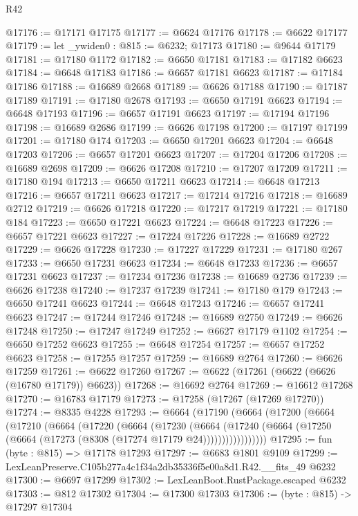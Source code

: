\begin{lexlean}{R42}
\begin{coremodule}
{@17176 := @17171 @17175
@17177 := @6624 @17176
@17178 := @6622 @17177
@17179 := let _ywiden0 : @815 := @6232; @17173
@17180 := @9644 @17179
@17181 := @17180 @1172
@17182 := @6650 @17181
@17183 := @17182 @6623
@17184 := @6648 @17183
@17186 := @6657 @17181 @6623
@17187 := @17184 @17186
@17188 := @16689 @2668
@17189 := @6626 @17188
@17190 := @17187 @17189
@17191 := @17180 @2678
@17193 := @6650 @17191 @6623
@17194 := @6648 @17193
@17196 := @6657 @17191 @6623
@17197 := @17194 @17196
@17198 := @16689 @2686
@17199 := @6626 @17198
@17200 := @17197 @17199
@17201 := @17180 @174
@17203 := @6650 @17201 @6623
@17204 := @6648 @17203
@17206 := @6657 @17201 @6623
@17207 := @17204 @17206
@17208 := @16689 @2698
@17209 := @6626 @17208
@17210 := @17207 @17209
@17211 := @17180 @194
@17213 := @6650 @17211 @6623
@17214 := @6648 @17213
@17216 := @6657 @17211 @6623
@17217 := @17214 @17216
@17218 := @16689 @2712
@17219 := @6626 @17218
@17220 := @17217 @17219
@17221 := @17180 @184
@17223 := @6650 @17221 @6623
@17224 := @6648 @17223
@17226 := @6657 @17221 @6623
@17227 := @17224 @17226
@17228 := @16689 @2722
@17229 := @6626 @17228
@17230 := @17227 @17229
@17231 := @17180 @267
@17233 := @6650 @17231 @6623
@17234 := @6648 @17233
@17236 := @6657 @17231 @6623
@17237 := @17234 @17236
@17238 := @16689 @2736
@17239 := @6626 @17238
@17240 := @17237 @17239
@17241 := @17180 @179
@17243 := @6650 @17241 @6623
@17244 := @6648 @17243
@17246 := @6657 @17241 @6623
@17247 := @17244 @17246
@17248 := @16689 @2750
@17249 := @6626 @17248
@17250 := @17247 @17249
@17252 := @6627 @17179 @1102
@17254 := @6650 @17252 @6623
@17255 := @6648 @17254
@17257 := @6657 @17252 @6623
@17258 := @17255 @17257
@17259 := @16689 @2764
@17260 := @6626 @17259
@17261 := @6622 @17260
@17267 := @6622 (@17261 (@6622 (@6626 (@16780 @17179)) @6623))
@17268 := @16692 @2764
@17269 := @16612 @17268
@17270 := @16783 @17179
@17273 := @17258 (@17267 (@17269 @17270))
@17274 := @8335 @4228
@17293 := @6664
    (@17190
      (@6664
        (@17200
          (@6664
            (@17210
              (@6664
                (@17220
                  (@6664
                    (@17230
                      (@6664
                        (@17240
                          (@6664 (@17250 (@6664 (@17273 (@8308 (@17274 @17179 @24)))))))))))))))))
@17295 := fun (byte : @815) => @17178 @17293
@17297 := @6683 @1801 @9109
@17299 := LexLeanPreserve.C105b277a4c1f34a2db35336f5e00a8d1.R42.__fits_49 @6232
@17300 := @6697 @17299
@17302 := LexLeanBoot.RustPackage.escaped @6232
@17303 := @812 @17302
@17304 := @17300 @17303
@17306 := (byte : @815) -> @17297 @17304
}
\end{coremodule}
\end{lexlean}
